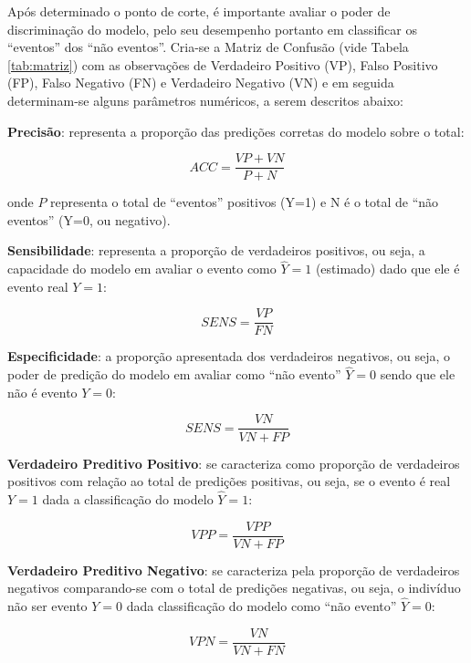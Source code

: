 \documentclass[12pt,brazil,oneside]{book}
\begin{document}
Após determinado o ponto de corte, é importante avaliar o poder de discriminação do modelo, pelo seu desempenho portanto em classificar os ``eventos'' dos ``não eventos''. Cria-se a Matriz de Confusão (vide Tabela \ref{tab:matriz}) com as observações de Verdadeiro Positivo (VP), Falso Positivo (FP), Falso Negativo (FN) e Verdadeiro Negativo (VN) e em seguida determinam-se alguns parâmetros numéricos, a serem descritos abaixo:

\textbf{Precisão}: representa a proporção das predições corretas do modelo sobre o total:

\[
ACC=\frac{VP+VN}{P+N}
\]

onde \(P\) representa o total de ``eventos'' positivos (Y=1) e N é o total de ``não eventos'' (Y=0, ou negativo).

\textbf{Sensibilidade}: representa a proporção de verdadeiros positivos, ou seja, a capacidade do modelo em avaliar o evento como \(\hat Y=1\) (estimado) dado que ele é evento real \(Y=1\):

\[
SENS=\frac{VP}{FN}
\]

\textbf{Especificidade}: a proporção apresentada dos verdadeiros negativos, ou seja, o poder de predição do modelo em avaliar como ``não evento'' \(\hat Y=0\) sendo que ele não é evento \(Y=0\):

\[
SENS=\frac{VN}{VN+FP}
\]

\textbf{Verdadeiro Preditivo Positivo}: se caracteriza como proporção de verdadeiros positivos com relação ao total de predições positivas, ou seja, se o evento é real \(Y=1\) dada a classificação do modelo \(\hat Y=1\):

\[
VPP=\frac{VPP}{VN+FP}
\]

\textbf{Verdadeiro Preditivo Negativo}: se caracteriza pela proporção de verdadeiros negativos comparando-se com o total de predições negativas, ou seja, o indivíduo não ser evento \(Y=0\) dada classificação do modelo como ``não evento'' \(\hat Y=0\):

\[
VPN=\frac{VN}{VN+FN}
\]
\end{document}
